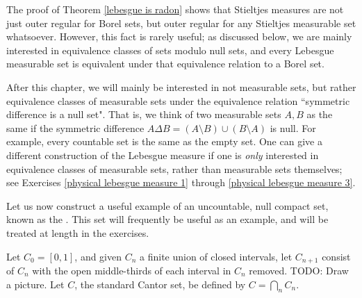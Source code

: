 \begin{subsec}
The proof of Theorem \ref{lebesgue is radon} shows that Stieltjes measures are not just outer regular for Borel sets, but outer regular for any Stieltjes measurable set whatsoever.
However, this fact is rarely useful; as discussed below, we are mainly interested in equivalence classes of sets modulo null sets, and every Lebesgue measurable set is equivalent under that equivalence relation to a Borel set.
\end{subsec}

\begin{subsec}
After this chapter, we will mainly be interested in not measurable sets, but rather equivalence classes of measurable sets under the equivalence relation ``symmetric difference is a null set".
That is, we think of two measurable sets $A,B$ as the same if the symmetric difference $A \Delta B = (A \setminus B) \cup (B \setminus A)$ is null.
For example, every countable set is the same as the empty set.
One can give a different construction of the Lebesgue measure if one is \emph{only} interested in equivalence classes of measurable sets, rather than measurable sets themselves; see Exercises \ref{physical lebesgue measure 1} through \ref{physical lebesgue measure 3}.
\end{subsec}

\begin{subsec}
Let us now construct a useful example of an uncountable, null compact set, known as the .
This set will frequently be useful as an example, and will be treated at length in the exercises.

Let $C_0 = [0, 1]$, and given $C_n$ a finite union of closed intervals, let $C_{n+1}$ consist of $C_n$ with the open middle-thirds of each interval in $C_n$ removed. TODO: Draw a picture.
Let $C$, the standard Cantor set, be defined by $C = \bigcap_n C_n$.
\end{subsec}

